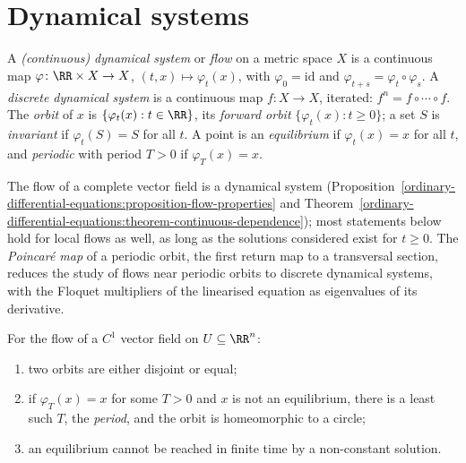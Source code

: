 \section{Dynamical systems}\label{ordinary-differential-equations:section-dynamical-systems}

\begin{definition}\label{ordinary-differential-equations:definition-dynamical-system}
A \emph{(continuous) dynamical system} or \emph{flow} on a metric space $X$ is a continuous map $\varphi \colon \RR \times X \to X$, $(t, x) \mapsto \varphi_t(x)$, with $\varphi_0 = \mathrm{id}$ and $\varphi_{t+s} = \varphi_t \circ \varphi_s$. A
\emph{discrete dynamical system} is a continuous map $f \colon X \to X$, iterated: $f^n = f \circ \cdots \circ f$. The \emph{orbit} of $x$ is $\{\varphi_t(x) : t \in \RR\}$, its \emph{forward orbit} $\{\varphi_t(x) : t \geq 0\}$; a set $S$ is
\emph{invariant} if $\varphi_t(S) = S$ for all $t$. A point is an \emph{equilibrium} if $\varphi_t(x) = x$ for all $t$, and \emph{periodic} with period $T > 0$ if $\varphi_T(x) = x$.
\end{definition}

The flow of a complete vector field is a dynamical system (Proposition~\ref{ordinary-differential-equations:proposition-flow-properties} and Theorem~\ref{ordinary-differential-equations:theorem-continuous-dependence}); most statements
below hold for local flows as well, as long as the solutions considered exist for $t \geq 0$. The \emph{Poincar\'e map} of a periodic orbit, the first return map to a transversal section, reduces the study of flows near periodic orbits
to discrete dynamical systems, with the Floquet multipliers of the linearised equation as eigenvalues of its derivative.

\begin{proposition}\label{ordinary-differential-equations:proposition-orbits}
For the flow of a $C^1$ vector field on $U \subseteq \RR^n$:
\begin{enumerate}
\item two orbits are either disjoint or equal;
\item if $\varphi_T(x) = x$ for some $T > 0$ and $x$ is not an equilibrium, there is a least such $T$, the \emph{period}, and the orbit is homeomorphic to a circle;
\item an equilibrium cannot be reached in finite time by a non-constant solution.
\end{enumerate}
\end{proposition}

